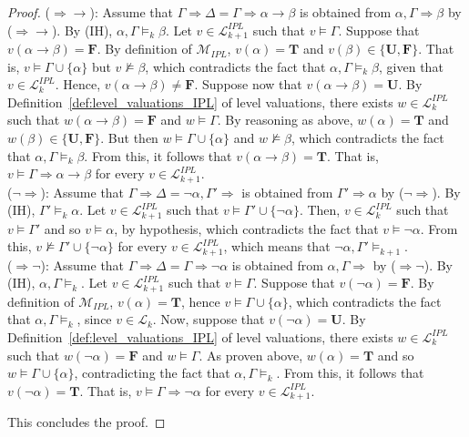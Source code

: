 \documentclass[10pt,a4paper]{amsart}
\newcommand{\bF}{\mathbf{F}}
\newcommand{\bT}{\mathbf{T}}
\newcommand{\bU}{\mathbf{U}}
\begin{document}
\begin{proof}
%
($\Rightarrow\to$): Assume that $\Gamma \Rightarrow\Delta= \Gamma\Rightarrow \alpha \to \beta$ is obtained from $\alpha,  \Gamma \Rightarrow \beta$ by ($\Rightarrow\to$). By (IH),  $\alpha,  \Gamma\models_{k} \beta$. Let $v \in \mathcal{L}_{k+1}^{IPL}$ such that $v \models \Gamma$. Suppose that $v(\alpha \to \beta)=\bF$. By definition of $\mathcal{M}_{IPL}$, $v(\alpha)=\bT$ and $v(\beta) \in \{\bU,\bF\}$. That is, $v \models\Gamma \cup\{\alpha\}$ but $v \not\models\beta$, which contradicts the fact that $\alpha,  \Gamma\models_{k} \beta$, given that $v \in \mathcal{L}_{k}^{IPL}$. Hence, $v(\alpha \to \beta)\neq\bF$. Suppose now that $v(\alpha \to \beta)=\bU$. By Definition~\ref{def:level_valuations_IPL} of level valuations, there exists $w \in \mathcal{L}_{k}^{IPL}$ such that  $w(\alpha \to \beta)=\bF$ and $w \models \Gamma$. By reasoning as above, $w(\alpha)=\bT$ and $w(\beta) \in \{\bU,\bF\}$. But then $w \models \Gamma \cup\{\alpha\}$ and $w \not\models\beta$, which contradicts the fact that  $\alpha,  \Gamma\models_{k} \beta$. From this, it follows that  $v(\alpha \to \beta)=\bT$. That is, $v\models \Gamma\Rightarrow \alpha\to\beta$ for every $v \in \mathcal{L}_{k+1}^{IPL}$.\\[1mm]
%
($\neg\Rightarrow$): Assume that $\Gamma \Rightarrow\Delta= \neg \alpha,\Gamma'\Rightarrow$ is obtained from $\Gamma' \Rightarrow \alpha$ by ($\neg\Rightarrow$). By (IH),  $\Gamma'\models_{k} \alpha$. Let $v \in \mathcal{L}_{k+1}^{IPL}$ such that $v \models \Gamma' \cup\{\neg\alpha\}$. Then, $v \in \mathcal{L}_{k}^{IPL}$ such that $v \models \Gamma'$ and so $v \models \alpha$, by hypothesis, which contradicts the fact that $v \models \neg\alpha$.  From this,  $v \not\models\Gamma' \cup\{\neg\alpha\}$ for every $v \in \mathcal{L}_{k+1}^{IPL}$, which means that $\neg\alpha,\Gamma'\models_{k+1}$. \\[1mm]
%
($\Rightarrow\neg$): Assume that $\Gamma \Rightarrow\Delta= \Gamma\Rightarrow \neg\alpha$ is obtained from $\alpha,  \Gamma \Rightarrow$ by ($\Rightarrow\neg$). By (IH),  $\alpha,  \Gamma\models_{k} $. Let $v \in \mathcal{L}_{k+1}^{IPL}$ such that $v \models \Gamma$. Suppose that $v(\neg\alpha)=\bF$. By definition of $\mathcal{M}_{IPL}$, $v(\alpha)=\bT$, hence $v \models\Gamma \cup\{\alpha\}$, which contradicts the fact that $\alpha,  \Gamma\models_{k}$, since $v \in \mathcal{L}_{k}$. Now, suppose that $v(\neg\alpha)=\bU$. By Definition~\ref{def:level_valuations_IPL} of level valuations, there exists $w \in \mathcal{L}_{k}^{IPL}$ such that  $w(\neg\alpha)=\bF$ and $w \models \Gamma$. As proven above, $w(\alpha)=\bT$ and so $w \models \Gamma \cup\{\alpha\}$, contradicting the fact that  $\alpha,  \Gamma\models_{k}$. From this, it follows that  $v(\neg\alpha)=\bT$. That is, $v\models \Gamma\Rightarrow \neg\alpha$ for every $v \in \mathcal{L}_{k+1}^{IPL}$.

This concludes the proof.
\end{proof}
\end{document}
